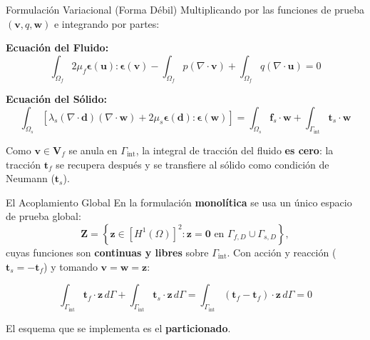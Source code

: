 \begin{frame}[allowframebreaks]{Formulación Variacional (Forma Débil)}
    Multiplicando por las funciones de prueba $(\mathbf{v}, q, \mathbf{w})$ e integrando por partes:
    
    \vspace{0.2cm}
    \textbf{Ecuación del Fluido:}
    \small
    \begin{equation*}
        \int_{\Omega_f} 2\mu_f \boldsymbol{\epsilon}(\mathbf{u}) : \boldsymbol{\epsilon}(\mathbf{v}) - \int_{\Omega_f} p (\nabla \cdot \mathbf{v}) + \int_{\Omega_f} q (\nabla \cdot \mathbf{u}) = 0
    \end{equation*}
    \normalsize
    
    \vspace{0.2cm}
    \textbf{Ecuación del Sólido:}
    \small
    \begin{equation*}
        \int_{\Omega_s} \left[ \lambda_s (\nabla \cdot \mathbf{d})(\nabla \cdot \mathbf{w}) + 2\mu_s \boldsymbol{\epsilon}(\mathbf{d}) : \boldsymbol{\epsilon}(\mathbf{w}) \right] = \int_{\Omega_s} \mathbf{f}_s \cdot \mathbf{w} + \int_{\Gamma_{\text{int}}} \mathbf{t}_s \cdot \mathbf{w}
    \end{equation*}
    \normalsize
    
    \vspace{0.3cm}
    Como $\mathbf{v} \in \mathbf{V}_f$ se anula en $\Gamma_{\text{int}}$, la integral de tracción del fluido \textbf{es cero}: la tracción $\mathbf{t}_f$ se recupera después y se transfiere al sólido como condición de Neumann ($\mathbf{t}_s$).
\end{frame}

\begin{frame}[allowframebreaks]{El Acoplamiento Global}
    En la formulación \textbf{monolítica} se usa un único espacio de prueba global:
    \begin{equation*}
        \mathbf{Z} = \left\{ \mathbf{z} \in [H^1(\Omega)]^2 : \mathbf{z} = \mathbf{0} \text{ en } \Gamma_{f,D} \cup \Gamma_{s,D} \right\},
    \end{equation*}
    cuyas funciones son \textbf{continuas y libres} sobre $\Gamma_{\text{int}}$. Con acción y reacción ($\mathbf{t}_s = -\mathbf{t}_f$) y tomando $\mathbf{v} = \mathbf{w} = \mathbf{z}$:
    
    \begin{equation*}
        \int_{\Gamma_{\text{int}}} \mathbf{t}_f \cdot \mathbf{z} \, d\Gamma + \int_{\Gamma_{\text{int}}} \mathbf{t}_s \cdot \mathbf{z} \, d\Gamma = \int_{\Gamma_{\text{int}}} (\mathbf{t}_f - \mathbf{t}_f) \cdot \mathbf{z} \, d\Gamma = 0
    \end{equation*}

    \vspace{0.5cm}
    {\small El esquema que se implementa es el \textbf{particionado}.}
\end{frame}

